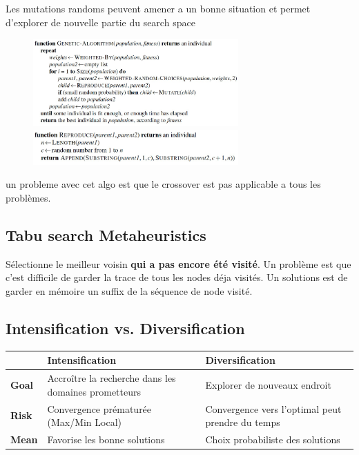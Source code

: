 		Les mutations randoms peuvent amener a un bonne situation et permet d'explorer de nouvelle partie du search space
		
		\begin{figure}[htp]
			\centering
			\includegraphics[width=0.7\textwidth]{img/AlgoGA1.png}
			\includegraphics[width=0.7\textwidth]{img/AlgoGA2.png}
		\end{figure}
		
		un probleme avec cet algo est que le crossover est pas applicable a tous les problèmes.
		
	\subsection{Tabu search Metaheuristics}
		
		Sélectionne le meilleur voisin \textbf{qui a pas encore été visité}. Un problème est que c'est difficile de garder la trace de tous les nodes déja visités. Un solutions est de garder en mémoire un suffix de la séquence de node visité.
		
	\subsection{Intensification vs. Diversification}
		\begin{tabular}{|l|p{}|p{}|}
			\hline
			& Intensification & Diversification\\
			\hline
			\textbf{Goal} & Accroître la recherche dans les domaines prometteurs & Explorer de nouveaux endroit\\
			\hline
			\textbf{Risk} & Convergence prématurée (Max/Min Local) & Convergence vers l'optimal peut prendre du temps\\
			\hline
			\textbf{Mean} & Favorise les bonne solutions & Choix probabiliste des solutions\\
			\hline
			
		\end{tabular}
		
